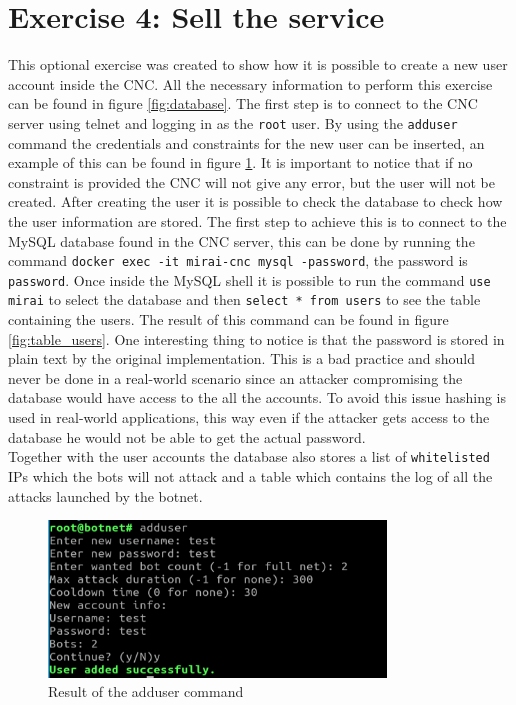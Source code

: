 \section{Exercise 4: Sell the service}
This optional exercise was created to show how it is possible to create a new user account inside the CNC. All the necessary information to perform this exercise can be found in figure \ref{fig:database}. The first step is to connect to the CNC server using telnet and logging in as the \texttt{root} user. By using the \texttt{adduser} command the credentials and constraints for the new user can be inserted, an example of this can be found in figure \ref{fig:add_user}. It is important to notice that if no constraint is provided the CNC will not give any error, but the user will not be created. After creating the user it is possible to check the database to check how the user information are stored. The first step to achieve this is to connect to the MySQL database found in the CNC server, this can be done by running the command \texttt{docker exec -it mirai-cnc mysql -password}, the password is \texttt{password}. Once inside the MySQL shell it is possible to run the command \texttt{use mirai} to select the database and then \texttt{select * from users} to see the table containing the users. The result of this command can be found in figure \ref{fig:table_users}. One interesting thing to notice is that the password is stored in plain text by the original implementation. This is a bad practice and should never be done in a real-world scenario since an attacker compromising the database would have access to the all the accounts. To avoid this issue hashing is used in real-world applications, this way even if the attacker gets access to the database he would not be able to get the actual password. \\
Together with the user accounts the database also stores a list of \texttt{whitelisted} IPs which the bots will not attack and a table which contains the log of all the attacks launched by the botnet.

\begin{figure}
    \centering
    \includegraphics[width=0.8\textwidth]{resources/images/add_user.png}
    \caption{Result of the adduser command}
    \label{fig:add_user}
\end{figure}

